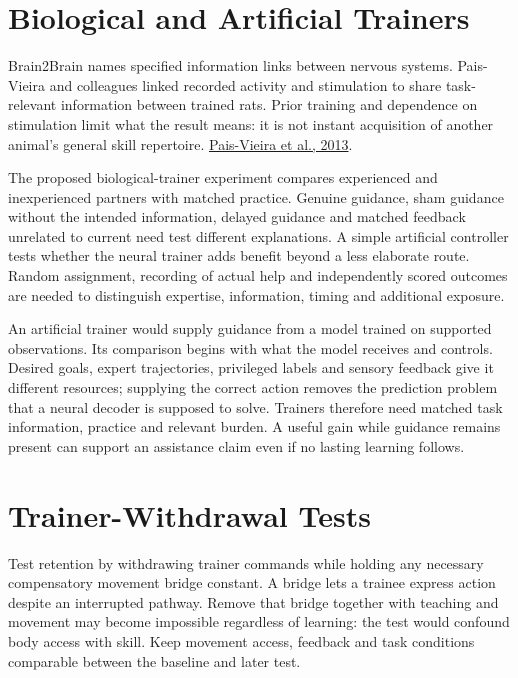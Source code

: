 \section{Biological and Artificial Trainers}

Brain2Brain names specified information links between nervous systems. Pais-Vieira and colleagues linked recorded activity and stimulation to share task-relevant information between trained rats. Prior training and dependence on stimulation limit what the result means: it is not instant acquisition of another animal's general skill repertoire. \href{https://www.nature.com/articles/srep01319}{Pais-Vieira et al., 2013}.\par

The proposed biological-trainer experiment compares experienced and inexperienced partners with matched practice. Genuine guidance, sham guidance without the intended information, delayed guidance and matched feedback unrelated to current need test different explanations. A simple artificial controller tests whether the neural trainer adds benefit beyond a less elaborate route. Random assignment, recording of actual help and independently scored outcomes are needed to distinguish expertise, information, timing and additional exposure.\par

An artificial trainer would supply guidance from a model trained on supported observations. Its comparison begins with what the model receives and controls. Desired goals, expert trajectories, privileged labels and sensory feedback give it different resources; supplying the correct action removes the prediction problem that a neural decoder is supposed to solve. Trainers therefore need matched task information, practice and relevant burden. A useful gain while guidance remains present can support an assistance claim even if no lasting learning follows.\par

\section{Trainer-Withdrawal Tests}

Test retention by withdrawing trainer commands while holding any necessary
compensatory movement bridge constant. A bridge lets a trainee express action
despite an interrupted pathway. Remove that bridge together with teaching and
movement may become impossible regardless of learning: the test would confound
body access with skill. Keep movement access, feedback and task conditions
comparable between the baseline and later test.\par

